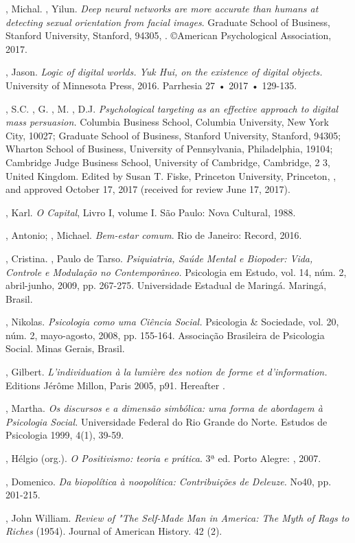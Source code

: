 \begin{Parskip}
, Michal. , Yilun. \emph{Deep neural networks are more
accurate than humans at detecting sexual orientation from facial
images}. Graduate School of Business, Stanford University,
Stanford, 94305, . ©American Psychological Association, 2017.

, Jason. \emph{Logic of digital worlds. Yuk Hui, on the
existence of digital objects.} University of Minnesota Press, 2016.
Parrhesia 27 • 2017 • 129-135.

, S.C. , G. , M. , D.J. \emph{Psychological targeting as an effective approach to digital mass persuasion.} Columbia
Business School, Columbia University, New York City,  10027; Graduate
School of Business, Stanford University, Stanford,  94305; Wharton
School of Business, University of Pennsylvania, Philadelphia,  19104;
Cambridge Judge Business School, University of Cambridge, Cambridge, 2
3, United Kingdom. Edited by Susan T. Fiske, Princeton University,
Princeton, , and approved October 17, 2017 (received for review June
17, 2017).

, Karl. \emph{O Capital}, Livro I, volume I. São Paulo: Nova
Cultural, 1988.

, Antonio; , Michael. \emph{Bem-estar comum}. Rio de
Janeiro: Record, 2016.

, Cristina. , Paulo de Tarso.
\emph{Psiquiatria, Saúde Mental e Biopoder: Vida, Controle e Modulação
no Contemporâneo.} Psicologia em Estudo, vol. 14, núm. 2, abril-junho,
2009, pp. 267-275. Universidade Estadual de Maringá. Maringá, Brasil.

, Nikolas. \emph{Psicologia como uma Ciência Social.} Psicologia
\& Sociedade, vol. 20, núm. 2, mayo-agosto, 2008, pp. 155-164.
Associação Brasileira de Psicologia Social. Minas Gerais, Brasil.

, Gilbert. \emph{L'individuation à la lumière des notion de
forme et d'information.} Editions Jérôme Millon, Paris 2005, p91.
Hereafter .

, Martha. \emph{Os discursos e a dimensão simbólica: uma
forma de abordagem à Psicologia Social.} Universidade Federal do Rio
Grande do Norte. Estudos de Psicologia 1999, 4(1), 39-59.

, Hélgio (org.). \emph{O Positivismo: teoria e prática}. 3ª
ed. Porto Alegre: , 2007.

, Domenico. \emph{Da biopolítica à noopolítica: Contribuições de Deleuze.}  No40, pp. 201-215.

, John William. \emph{Review of "The Self-Made Man in America:
The Myth of Rags to Riches} (1954). Journal of American History. 42 (2).
\end{Parskip}